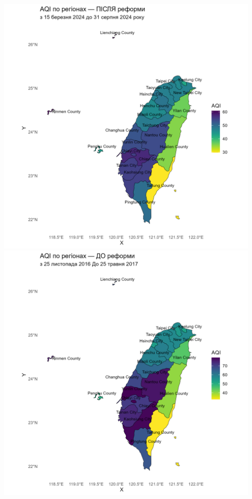 \documentclass[./report.tex]{subfiles}
\begin{document}
\begin{enumerate}
  \includegraphics[width=\linewidth]{plots/question5/map_after_reform.png}
  \includegraphics[width=\linewidth]{plots/question5/map_before_reform.png}

\end{enumerate}
\end{document}
